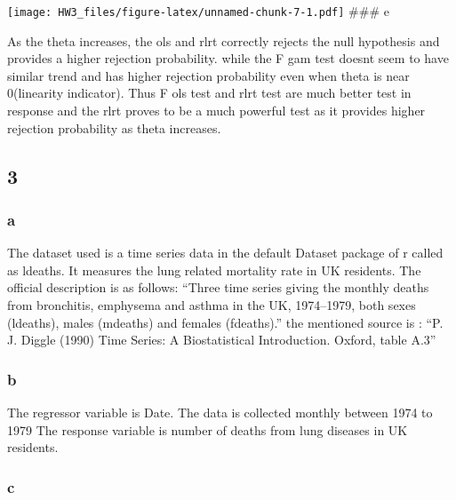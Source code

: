 \documentclass[
]{article}
\begin{document}
\texttt{[image: HW3\_files/figure-latex/unnamed-chunk-7-1.pdf]} \#\#\# e

As the theta increases, the ols and rlrt correctly rejects the null
hypothesis and provides a higher rejection probability. while the F gam
test doesnt seem to have similar trend and has higher rejection
probability even when theta is near 0(linearity indicator). Thus F ols
test and rlrt test are much better test in response and the rlrt proves
to be a much powerful test as it provides higher rejection probability
as theta increases.

\hypertarget{section-2}{%
\subsection{3}\label{section-2}}

\hypertarget{a-2}{%
\subsubsection{a}\label{a-2}}

The dataset used is a time series data in the default Dataset package of
r called as ldeaths. It measures the lung related mortality rate in UK
residents. The official description is as follows: ``Three time series
giving the monthly deaths from bronchitis, emphysema and asthma in the
UK, 1974--1979, both sexes (ldeaths), males (mdeaths) and females
(fdeaths).'' the mentioned source is : ``P. J. Diggle (1990) Time
Series: A Biostatistical Introduction. Oxford, table A.3''

\hypertarget{b-2}{%
\subsubsection{b}\label{b-2}}

The regressor variable is Date. The data is collected monthly between
1974 to 1979 The response variable is number of deaths from lung
diseases in UK residents.

\hypertarget{c-1}{%
\subsubsection{c}\label{c-1}}
\end{document}
